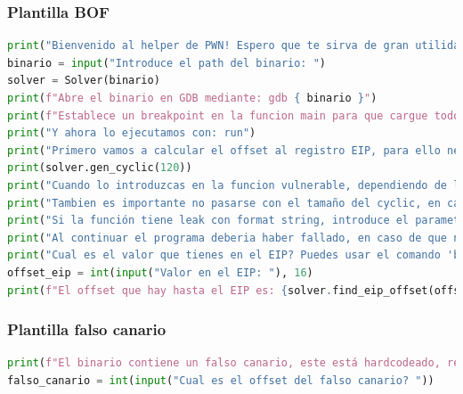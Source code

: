 \subsubsection{Plantilla BOF}
\begin{lstlisting}[language=Python, caption=Plantilla BOF]
print("Bienvenido al helper de PWN! Espero que te sirva de gran utilidad!")
binario = input("Introduce el path del binario: ")
solver = Solver(binario)
print(f"Abre el binario en GDB mediante: gdb { binario }")
print(f"Establece un breakpoint en la funcion main para que cargue todo: b main")
print("Y ahora lo ejecutamos con: run")
print("Primero vamos a calcular el offset al registro EIP, para ello necesitamos ir a la funcion vulnerable e introducir un payload ciclico, por ejemplo:")
print(solver.gen_cyclic(120))
print("Cuando lo introduzcas en la funcion vulnerable, dependiendo de las mitigaciones habilitadas, el resultado podría ser diferente")
print("Tambien es importante no pasarse con el tamaño del cyclic, en caso de que se rompa el puntero a buf strcpy podría fallar")
print("Si la función tiene leak con format string, introduce el parametro en la segunda funcion de input")
print("Al continuar el programa deberia haber fallado, en caso de que no sea asi, la longitud del payload no fue suficiente, intentalo con otro mas largo!")
print("Cual es el valor que tienes en el EIP? Puedes usar el comando 'bt' para ver el callstack, busca el valor justo despues de la funcion de input")
offset_eip = int(input("Valor en el EIP: "), 16)
print(f"El offset que hay hasta el EIP es: {solver.find_eip_offset(offset_eip)}")
\end{lstlisting}
\subsubsection{Plantilla falso canario}
\begin{lstlisting}[language=Python, caption=Plantilla falso canario]
print(f"El binario contiene un falso canario, este está hardcodeado, revisa en el código fuente o el ensamblador cual es su valor, después saca el offset siguiendo los pasos anteriores")
falso_canario = int(input("Cual es el offset del falso canario? "))
\end{lstlisting}

